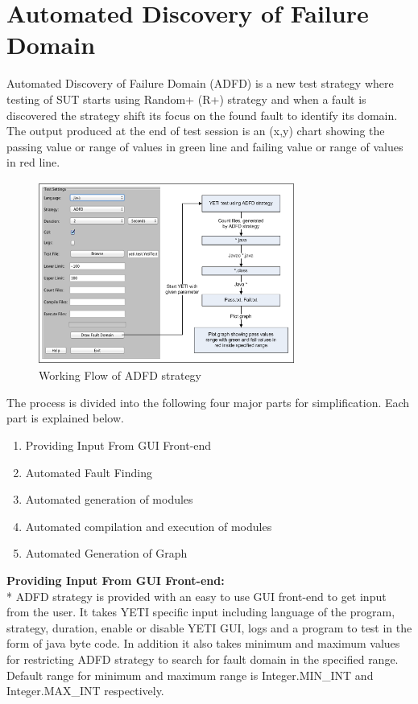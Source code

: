 \documentclass{acm_proc_article-sp}
\begin{document}
\section{Automated Discovery of Failure Domain}\label{sec:adfd}

Automated Discovery of Failure Domain (ADFD) is a new test strategy where testing of SUT starts using Random+ (R+) strategy and when a fault is discovered the strategy shift its focus on the found fault to identify its domain. The output produced at the end of test session is an (x,y) chart showing the passing value or range of values in green line and failing value or range of values in red line.

\begin{figure}[ht]
\includegraphics[width=8.4cm,height=6cm]{ADFD-Diagram1.png}
\caption{Working Flow of ADFD strategy}
\label{fig:patterns}
\end{figure}

The process is divided into the following four major parts for simplification. Each part is explained below.

\begin{enumerate}
\item Providing Input From GUI Front-end
\item Automated Fault Finding
\item Automated generation of modules
\item Automated compilation and execution of modules
\item Automated Generation of Graph\\
\end{enumerate}

\noindent \textbf{Providing Input From GUI Front-end:}\\*
ADFD strategy is provided with an easy to use GUI front-end to get input from the user. It takes YETI specific input including language of the program, strategy, duration, enable or disable YETI GUI, logs and a program to test in the form of java byte code. In addition it also takes minimum and maximum values for restricting ADFD strategy to search for fault domain in the specified range. Default range for minimum and maximum range is Integer.MIN\_INT and Integer.MAX\_INT respectively. 
\end{document}

